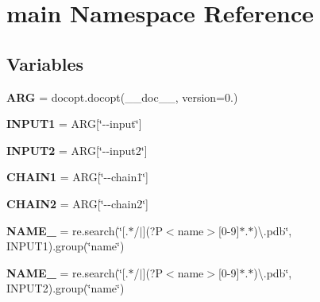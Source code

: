 \hypertarget{namespacemain}{}\section{main Namespace Reference}
\label{namespacemain}
\subsection*{Variables}
\begin{DoxyCompactItemize}
\item 
\mbox{\label{namespacemain_a123bd66e0a76322c4a59ac15f9034ea6}} 
{\bfseries A\+RG} = docopt.\+docopt(\+\_\+\+\_\+doc\+\_\+\+\_\+, version=\textquotesingle{}0.\textquotesingle{})
\item 
\mbox{\label{namespacemain_a780450b06adbe0e4fa8bf1347d96cdc3}} 
{\bfseries I\+N\+P\+U\+T1} = A\+RG\mbox{[}\char`\"{}-\/-\/input\char`\"{}\mbox{]}
\item 
\mbox{\label{namespacemain_abb60993449a96c946d681d0f9d087906}} 
{\bfseries I\+N\+P\+U\+T2} = A\+RG\mbox{[}\char`\"{}-\/-\/input2\char`\"{}\mbox{]}
\item 
\mbox{\label{namespacemain_a24f4db643c0a7c4611ff6cb12e079a76}} 
{\bfseries C\+H\+A\+I\+N1} = A\+RG\mbox{[}\char`\"{}-\/-\/chain1\char`\"{}\mbox{]}
\item 
\mbox{\label{namespacemain_aa0b8304e05185632385075ae9c668682}} 
{\bfseries C\+H\+A\+I\+N2} = A\+RG\mbox{[}\char`\"{}-\/-\/chain2\char`\"{}\mbox{]}
\item 
\mbox{\label{namespacemain_a56ef63776dd41eb9f7e3db1e630a4c3d}} 
{\bfseries N\+A\+M\+E\+\_} = re.\+search(\char`\"{}\mbox{[}.$\ast$/$\vert$\mbox{]}(?P$<$name$>$\mbox{[}0-\/9\mbox{]}$\ast$.$\ast$)\textbackslash{}.pdb\char`\"{}, I\+N\+P\+U\+T1).group(\char`\"{}name\char`\"{})
\item 
\mbox{\label{namespacemain_a379d3ec42b53ce15d1e12a362c8b078a}} 
{\bfseries N\+A\+M\+E\+\_} = re.\+search(\char`\"{}\mbox{[}.$\ast$/$\vert$\mbox{]}(?P$<$name$>$\mbox{[}0-\/9\mbox{]}$\ast$.$\ast$)\textbackslash{}.pdb\char`\"{}, I\+N\+P\+U\+T2).group(\char`\"{}name\char`\"{})
\item 

\end{DoxyCompactItemize}
